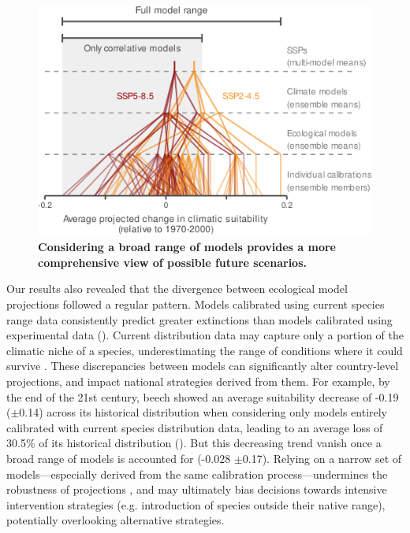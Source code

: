 \documentclass[11pt,letter]{article}
\begin{document}
\begin{figure}
	\centering
	\includegraphics[width=0.6\linewidth]{../newfigures/files/uncertaintycascade}
	\caption{\textbf{Considering a broad range of models provides a more comprehensive view of possible future scenarios.}}
	\label{fig:cascade}
\end{figure}

Our results also revealed that the divergence between ecological model projections followed a regular pattern. Models calibrated using current species range data consistently predict greater extinctions than models calibrated using experimental data (). 
Current distribution data may capture only a portion of the climatic niche of a species, underestimating the range of conditions where it could survive \citep{Chevalier2024, NoguesBravo2016}.
These discrepancies between models can significantly alter country-level projections, and impact national strategies derived from them. 
For example, by the end of the 21st century, beech showed an average suitability decrease of -0.19 ($\pm$0.14) across its historical distribution when considering only models entirely calibrated with current species distribution data, leading to an average loss of 30.5\% of its historical distribution (). But this decreasing trend vanish once a broad range of models is accounted for (-0.028 $\pm$0.17).
Relying on a narrow set of models---especially derived from the same calibration process---undermines the robustness of projections \citep{Dawson2011}, and may ultimately bias decisions towards intensive intervention strategies (e.g. introduction of species outside their native range), potentially overlooking alternative strategies.
\end{document}
